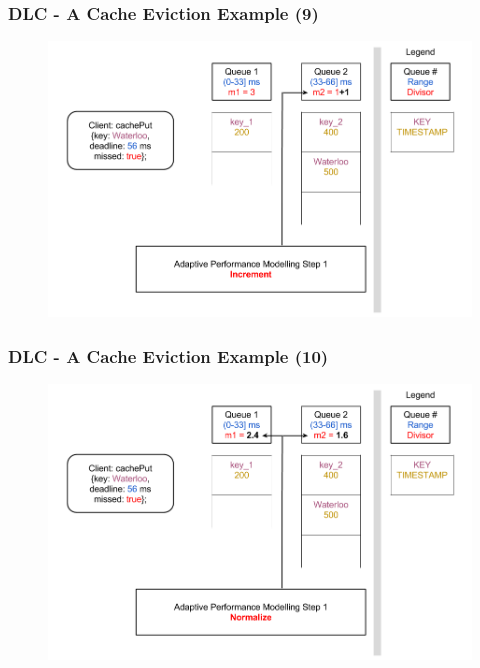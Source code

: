 \documentclass{beamer}
\begin{document}
\begin{frame}
  \frametitle{DLC - A Cache Eviction Example (9)}
  \begin{figure}
    \begin{center}
      \centerline{\includegraphics[scale=0.37]{img/DLC_V8_09.png}}
    \end{center}
  \end{figure}
\end{frame}

\begin{frame}
  \frametitle{DLC - A Cache Eviction Example (10)}
  \begin{figure}
    \begin{center}
      \centerline{\includegraphics[scale=0.37]{img/DLC_V8_10.png}}
    \end{center}
  \end{figure}
\end{frame}
\end{document}
